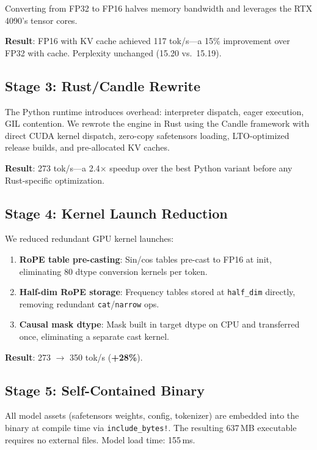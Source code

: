 \documentclass[11pt,a4paper]{article}
\begin{document}
Converting from FP32 to FP16 halves memory bandwidth and leverages the
RTX 4090's tensor cores.

\textbf{Result}: FP16 with KV cache achieved 117 tok/s---a 15\%
improvement over FP32 with cache. Perplexity unchanged (15.20 vs.\ 15.19).

\subsection{Stage 3: Rust/Candle Rewrite}

The Python runtime introduces overhead: interpreter dispatch, eager
execution, GIL contention. We rewrote the engine in Rust using the Candle
framework with direct CUDA kernel dispatch, zero-copy safetensors loading,
LTO-optimized release builds, and pre-allocated KV caches.

\textbf{Result}: 273 tok/s---a 2.4$\times$ speedup over the best Python
variant before any Rust-specific optimization.

\subsection{Stage 4: Kernel Launch Reduction}

We reduced redundant GPU kernel launches:
\begin{enumerate}[nosep]
    \item \textbf{RoPE table pre-casting}: Sin/cos tables pre-cast to FP16
          at init, eliminating 80 dtype conversion kernels per token.
    \item \textbf{Half-dim RoPE storage}: Frequency tables stored at
          \texttt{half\_dim} directly, removing redundant \texttt{cat}/\texttt{narrow} ops.
    \item \textbf{Causal mask dtype}: Mask built in target dtype on CPU and
          transferred once, eliminating a separate cast kernel.
\end{enumerate}

\textbf{Result}: 273 $\to$ 350 tok/s (\textbf{+28\%}).

\subsection{Stage 5: Self-Contained Binary}

All model assets (safetensors weights, config, tokenizer) are embedded
into the binary at compile time via \texttt{include\_bytes!}. The resulting
637\,MB executable requires no external files. Model load time: 155\,ms.
\end{document}
